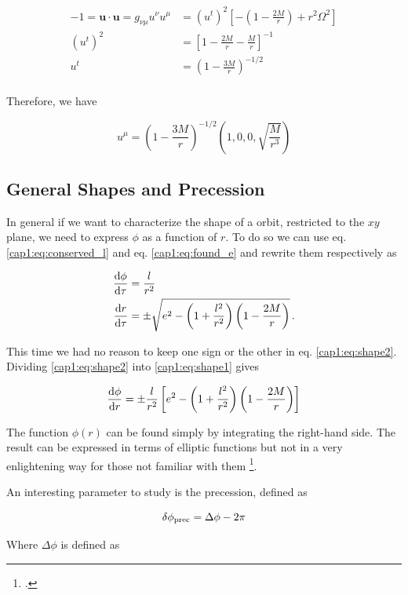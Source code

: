 \begin{align*}
    - 1 = \mathbf{u \cdot u} = g_{\nu \mu} u^\nu u^\mu
    &= (u^t)^2 \left[- \left(1 - \frac{2M}{r}\right) + r^2 \Omega^2 \right] \\
    (u^t)^2 &= \left[ 1 - \frac{2M}{r} - \frac{M}{r}\right]^{-1} \\
    u^t &= \left( 1 - \frac{3M}{r} \right)^{-1/2} \\
\end{align*}

Therefore, we have

\begin{equation}
    u^\mu = \left( 1 - \frac{3M}{r} \right)^{-1/2}
    \left( 1, 0, 0, \sqrt{\frac{M}{r^3}} \right)
\end{equation}


\subsection{General Shapes and Precession}

In general if we want to characterize the shape of a orbit, restricted to the
$xy$ plane, we need to express $\phi$ as a function of $r$.
To do so we can use eq. \ref{cap1:eq:conserved_l} and eq. \ref{cap1:eq:found_e}
and rewrite them respectively as

\begin{subequations}
\begin{align}
    \dv{\phi}{\tau} &= \frac{l}{r^2} \label{cap1:eq:shape1} \\
    \dv{r}{\tau} &= \pm \sqrt{e^2 - \left(1 + \frac{l^2}{r^2}\right)
    \left(1 - \frac{2M}{r}\right)} \label{cap1:eq:shape2} \, .
\end{align}
\label{cap1:eq:to_find_shape}
\end{subequations}

This time we had no reason to keep one sign or the other in eq.
\ref{cap1:eq:shape2}.
Dividing \ref{cap1:eq:shape2} into \ref{cap1:eq:shape1} gives

\begin{equation}
    \dv{\phi}{r} = \pm \frac{l}{r^2}
    \left[e^2 - \left(1 + \frac{l^2}{r^2}\right)
    \left(1 - \frac{2M}{r}\right)\right]
    \label{cap1:eq:shape}
\end{equation}

The function $\phi(r)$ can be found simply by integrating the right-hand side.
The result can be expressed in terms of elliptic functions but not in a very
enlightening way for those not familiar with them
\footcite[page 202]{hartle2021gravity}.

An interesting parameter to study is the precession, defined as

\begin{equation}
    \delta \phi_{\rm prec} = \Delta \phi - 2 \pi
    \label{cap1:eq:precession}
\end{equation}

Where $\Delta \phi$ is defined as 
